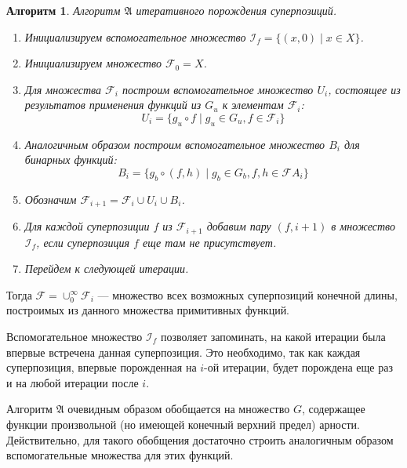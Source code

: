 \documentclass[12pt,a4paper]{amsart}
\newtheorem{algo}{Алгоритм}
\begin{document}
\begin{algo}
  Алгоритм $\mathfrak{A}$ итеративного порождения суперпозиций.
  \begin{enumerate}
	\item Инициализируем вспомогательное множество $\mathcal{I}_f = \{ (x, 0) \mid x \in X \}$.
	\item Инициализируем множество $\mathcal{F}_0 = X$.
	\item Для множества $\mathcal{F}_i$ построим вспомогательное множество $U_i$,
	  состоящее из результатов применения функций из $G_u$ к элементам $\mathcal{F}_i$:
	  \[
	  U_i = \{ g_u \circ f \mid g_u \in G_u, f \in \mathcal{F}_i \}
	  \]
	\item Аналогичным образом построим вспомогательное множество $B_i$ для
	  бинарных функций:
	  \[
	  B_i = \{ g_b \circ (f, h) \mid g_b \in G_b, f, h \in \mathcal{F}A_i \}
	  \]
	\item Обозначим $\mathcal{F}_{i+1} = \mathcal{F}_i \cup U_i \cup B_i$.
	\item Для каждой суперпозиции $f$ из $\mathcal{F}_{i+1}$ добавим пару
	  $(f, i+1)$ в множество $\mathcal{I}_f$, если суперпозиция $f$ еще там
	  не присутствует.
	\item Перейдем к следующей итерации. 
  \end{enumerate}
\end{algo}

Тогда $\mathcal{F} = \cup_0^\infty \mathcal{F}_i$ --- множество всех
возможных суперпозиций конечной длины, построимых из данного множества
примитивных функций.

Вспомогательное множество $\mathcal{I}_f$ позволяет запоминать, на какой
итерации была впервые встречена данная суперпозиция. Это необходимо, так
как каждая суперпозиция, впервые порожденная на $i$-ой итерации, будет
порождена еще раз и на любой итерации после $i$.

Алгоритм $\mathfrak{A}$ очевидным образом обобщается на множество $G$,
содержащее функции произвольной (но имеющей конечный верхний предел)
арности. Действительно, для такого обобщения достаточно строить аналогичным
образом вспомогательные множества для этих функций.
\end{document}
